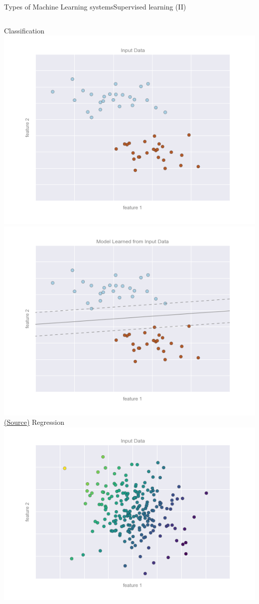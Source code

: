 \documentclass[10pt,compress]{beamer} %
\begin{document}
\begin{frame}{Types of Machine Learning systems}{Supervised learning (II)}
	\vspace{-0.25cm}
	\begin{columns}
	   \centering Classification\\
			\includegraphics[width=0.8\linewidth]{figs/05.01-classification-1.png}\\
			\includegraphics[width=0.8\linewidth]{figs/05.01-classification-2.png}\\
    		\tiny{\href{https://jakevdp.github.io/PythonDataScienceHandbook/05.01-what-is-machine-learning.html}{(Source)}}
	   \centering Regression
			\includegraphics[width=0.8\linewidth]{figs/05.01-regression-1.png}\\

\end{columns}
\end{frame}
\end{document}
